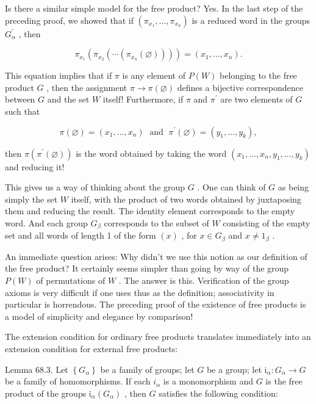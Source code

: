Is there a similar simple model for the free product? Yes. In the last step of the preceding proof, we showed that if \(\left( {{\pi }_{{x}_{1}},\ldots ,{\pi }_{{x}_{n}}}\right)\) is a reduced word in the groups \({G}_{\alpha }^{\prime }\) , then

\[
{\pi }_{{x}_{1}}\left( {{\pi }_{{x}_{2}}\left( {\cdots \left( {{\pi }_{{x}_{n}}\left( \varnothing \right) }\right) }\right) }\right)  = \left( {{x}_{1},\ldots ,{x}_{n}}\right) .
\]

This equation implies that if \(\pi\) is any element of \(P\left( W\right)\) belonging to the free product \(G\) , then the assignment \(\pi  \rightarrow  \pi \left( \varnothing \right)\) defines a bijective correspondence between \(G\) and the set \(W\) itself! Furthermore, if \(\pi\) and \({\pi }^{\prime }\) are two elements of \(G\) such that

\[
\pi \left( \varnothing \right)  = \left( {{x}_{1},\ldots ,{x}_{n}}\right) \;\text{ and }\;{\pi }^{\prime }\left( \varnothing \right)  = \left( {{y}_{1},\ldots ,{y}_{k}}\right) ,
\]

then \(\pi \left( {{\pi }^{\prime }\left( \varnothing \right) }\right)\) is the word obtained by taking the word \(\left( {{x}_{1},\ldots ,{x}_{n},{y}_{1},\ldots ,{y}_{k}}\right)\) and reducing it!

This gives us a way of thinking about the group \(G\) . One can think of \(G\) as being simply the set \(W\) itself, with the product of two words obtained by juxtaposing them and reducing the result. The identity element corresponds to the empty word. And each group \({G}_{\beta }\) corresponds to the subset of \(W\) consisting of the empty set and all words of length 1 of the form \(\left( x\right)\) , for \(x \in  {G}_{\beta }\) and \(x \neq  {1}_{\beta }\) .

An immediate question arises: Why didn't we use this notion as our definition of the free product? It certainly seems simpler than going by way of the group \(P\left( W\right)\) of permutations of \(W\) . The answer is this. Verification of the group axioms is very difficult if one uses thus as the definition; associativity in particular is horrendous. The preceding proof of the existence of free products is a model of simplicity and elegance by comparison!

The extension condition for ordinary free products translates immediately into an extension condition for external free products:

Lemma 68.3. Let \(\left\{  {G}_{\alpha }\right\}\) be a family of groups; let \(G\) be a group; let \({\mathrm{i}}_{\alpha } : {G}_{\alpha } \rightarrow  G\) be a family of homomorphisms. If each \({i}_{\alpha }\) is a monomorphism and \(G\) is the free product of the groups \({\mathrm{i}}_{\alpha }\left( {G}_{\alpha }\right)\) , then \(G\) satisfies the following condition:

